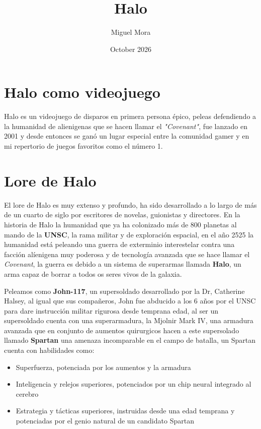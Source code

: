 \documentclass{article}
\title{Halo}
\author{Miguel Mora}
\date{October 2026}
\begin{document}
\maketitle

\section{Halo como videojuego}

Halo es un videojuego de disparos en primera persona épico, peleas defendiendo a la humanidad de alienigenas que se hacen llamar el \textit{"Covenant"}, fue lanzado en 2001 y desde entonces se ganó un lugar especial entre la comunidad gamer y en mi repertorio de juegos favoritos como el número 1.

\section{Lore de Halo}

El lore de Halo es muy extenso y profundo, ha sido desarrollado a lo largo de más de un cuarto de siglo por escritores de novelas, guionistas y directores.
En la historia de Halo la humanidad que ya ha colonizado más de 800 planetas al mando de la \textbf{UNSC}, la rama militar y de exploración espacial, en el año 2525 la humanidad está peleando una guerra de exterminio interestelar contra una facción alíenigena muy poderosa y de tecnología avanzada que se hace llamar el \textit{Covenant}, la guerra es debido a un sistema de superarmas llamada \textbf{Halo}, un arma capaz de borrar a todos os seres vivos de la galaxia.

Peleamos como \textbf{John-117}, un supersoldado desarrollado por la Dr, Catherine Halsey, al igual que sus compañeros, John fue abducido a los 6 años por el UNSC para dare instrucción militar rigurosa desde temprana edad, al ser un supersoldado cuenta con una superarmadura, la Mjolnir Mark IV, una armadura avanzada que en conjunto de aumentos quirurgicos hacen a este supersolado llamado \textbf{Spartan} una amenaza incomparable en el campo de batalla, un Spartan cuenta con habilidades como:
\begin{itemize}
    \item Superfuerza, potenciada por los aumentos y la armadura
    \item Inteligencia y relejos superiores, potenciados por un chip neural integrado al cerebro
    \item Estrategia y tácticas superiores, instruidas desde una edad temprana y potenciadas por el genio natural de un candidato Spartan
\end{itemize}
\newpage
\end{document}
